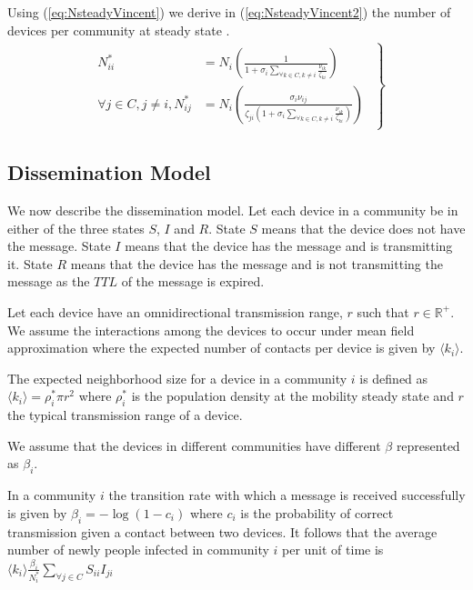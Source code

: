 \documentclass[review]{elsarticle}
\begin{document}
Using (\ref{eq:NsteadyVincent}) we derive in (\ref{eq:NsteadyVincent2}) the number of devices per community at steady state \cite{Sattenspiel1995}.
\begin{eqnarray}\label{eq:NsteadyVincent2}
    \left.\begin{matrix}\begin{aligned}
        N_{ii}^{*} &= N_{i} \left( \frac{1}{1 + \sigma_{i} \sum_{\forall k \in C, k\neq i} \frac{\nu_{ik}}{\zeta_{ki}}} \right)\\
        \displaystyle \forall j\in C, j\neq i, N_{ij}^{*} &= N_{i} \left( \frac{\sigma_{i}\nu_{ij}}{ \zeta_{ji} \left(1 + \sigma_{i} \sum_{\forall k\in C, k\neq i} \frac{\nu_{ik}}{\zeta_{ki}} \right)} \right)
    \end{aligned}\end{matrix}\right\}
\end{eqnarray}

\subsection{Dissemination Model}\label{subsec:C3_dissmodel}
We now describe the dissemination model. Let each device in a community be in either of the three states $S$, $I$ and $R$. State $S$ means that the device does not have the message. State $I$ means that the device has the message and is transmitting it. State $R$ means that the device has the message and is not transmitting the message as the $TTL$ of the message is expired.

Let each device have an omnidirectional transmission range, $r$ such that $r\in \mathbb{R}^+$. We assume the interactions among the devices to occur under mean field approximation where the expected number of contacts per device is given by $\langle k_{i}\rangle$.
\begin{definition}\label{defavdeg}
The expected neighborhood size for a device in a community $i$ is defined as $\langle k_{i}\rangle=\rho_{i}^{*}\pi r^2$ where $\rho_{i}^{*}$ is the population density at the mobility steady state and $r$ the typical transmission range of a device.
\end{definition}

We assume that the devices in different communities have different $\beta$ represented as $\beta_{i}$. 

\begin{definition}\label{defbeta}
In a community $i$ the transition rate with which a message is received successfully is given by $\beta_i  = -\log(1-c_i)$ where $c_i$ is the probability of correct transmission given a contact between two devices. It follows that the average number of newly people infected in community $i$ per unit of time is $\langle k_{i}\rangle \frac{\beta_{i}}{N_{i}^{*}} \sum_{\forall j \in C}  S_{ii} I_{ji}$
\end{definition}
\end{document}
